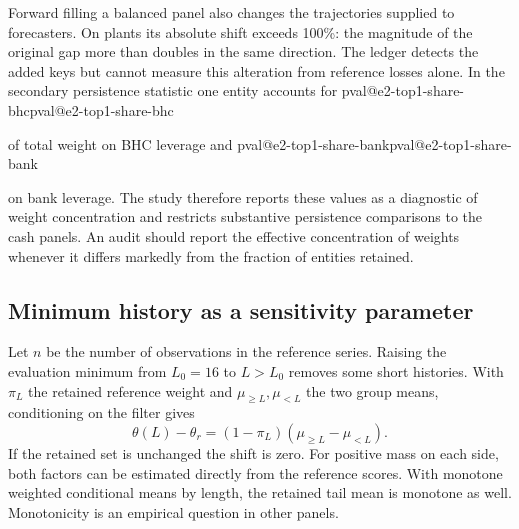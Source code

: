 \documentclass[linenumber]{jdsart}
\makeatletter
\newcommand{\val}[1]{\ifcsname pval@#1\endcsname\csname pval@#1\endcsname\else\PackageError{paper}{Missing value #1}{}\fi}
\makeatother
\begin{document}
Forward filling a balanced panel also changes the trajectories supplied to forecasters. On plants its absolute shift exceeds 100\%: the magnitude of the original gap more than doubles in the same direction. The ledger detects the added keys but cannot measure this alteration from reference losses alone. In the secondary persistence statistic one entity accounts for \val{e2-top1-share-bhc} of total weight on BHC leverage and \val{e2-top1-share-bank} on bank leverage. The study therefore reports these values as a diagnostic of weight concentration and restricts substantive persistence comparisons to the cash panels. An audit should report the effective concentration of weights whenever it differs markedly from the fraction of entities retained.

\subsection{Minimum history as a sensitivity parameter}
Let \(n\) be the number of observations in the reference series. Raising the evaluation minimum from \(L_0=16\) to \(L>L_0\) removes some short histories. With \(\pi_L\) the retained reference weight and \(\mu_{\ge L},\mu_{<L}\) the two group means, conditioning on the filter gives
\begin{equation}
\theta(L)-\theta_r=(1-\pi_L)(\mu_{\ge L}-\mu_{<L}). \label{eq:length}
\end{equation}
If the retained set is unchanged the shift is zero. For positive mass on each side, both factors can be estimated directly from the reference scores. With monotone weighted conditional means by length, the retained tail mean is monotone as well. Monotonicity is an empirical question in other panels.
\end{document}
